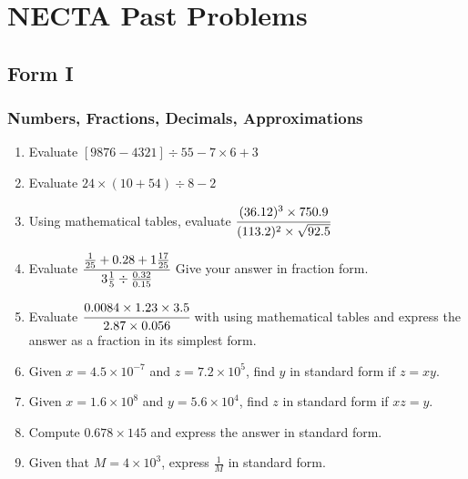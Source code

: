 \chapter{NECTA Past Problems}

\section{Form I}
	\subsection{Numbers, Fractions, Decimals, Approximations}
	
\begin{enumerate}


			\subsubsection{Evaluation / BODMAS}
	\item Evaluate $[9876 - 4321] \div 55 - 7 \times 6 + 3$
	
	\item Evaluate $24 \times (10 + 54) \div 8 - 2$
	
	\item Using mathematical tables, evaluate $\cfrac{(36.12)^3 \times 750.9}{(113.2)^2 \times \sqrt{92.5}}$
	
	 \item Evaluate $\cfrac{ \frac{1}{25} + 0.28 + 1\frac{17}{25} }{ 3\frac{1}{5} \div \frac{0.32}{0.15} }$ Give your answer in fraction form.
	 
	 \item Evaluate $\cfrac{0.0084 \times 1.23 \times 3.5}{2.87 \times 0.056}$ with using mathematical tables and express the answer as a fraction in its simplest form.

	\item Given $x = 4.5 \times 10^{-7}$ and $z = 7.2 \times 10^5$, find $y$ in standard form if $z = xy$.
	
	\item Given $x = 1.6 \times 10^8$ and $y = 5.6 \times 10^4$, find $z$ in standard form if $ xz = y$.
	
	\item Compute $0.678 \times 145$ and express the answer in standard form.
	
	\item Given that $M = 4 \times 10^3$, express $\frac{1}{M}$ in standard form.



\end{enumerate}
